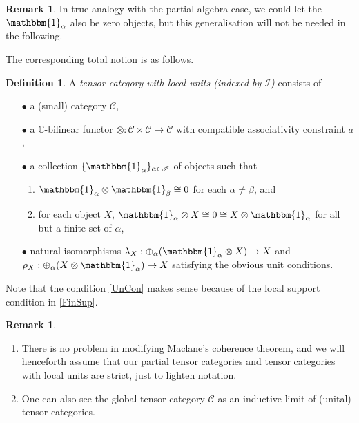 \documentclass[10pt]{article}
\newcommand{\C}{\mathbb{C}}
\newcommand{\CatC}{\mathcal{C}}
\newcommand{\Unitb}{\mathbbm{1}}
\theoremstyle{definition}
\newtheorem{Def}[Theorem]{Definition}
\newtheorem{Rem}[Theorem]{Remark}
\numberwithin{equation}{section}
\begin{document}
\begin{Rem} In true analogy with the partial algebra case, we could let the $\Unitb_\alpha$ also be zero objects, but this generalisation will not be needed in the following. 
\end{Rem}

The corresponding total notion is as follows. 

\begin{Def} A \emph{tensor category with local units (indexed by $\mathscr{I}$)} consists of
\begin{itemize}
\item[$\bullet$] a (small) category $\CatC$, 
\item[$\bullet$] a $\C$-bilinear functor $\otimes: \CatC\times \CatC \rightarrow \CatC$ with compatible associativity constraint $a$, 
\item[$\bullet$]\label{FinSup} a collection $\{\Unitb_\alpha\}_{\alpha\in \mathscr{I}}$ of objects such that 
\begin{enumerate}[label=(\arabic*)] 
\item $\Unitb_\alpha\otimes \Unitb_\beta \cong 0$ for each $\alpha\neq \beta$, and
\item for each object $X$,  $\Unitb_\alpha\otimes X \cong 0 \cong X\otimes \Unitb_\alpha$ for all but a finite set of $\alpha$,
\end{enumerate}
\item[$\bullet$]\label{UnCon} natural isomorphisms $\lambda_X:\oplus_\alpha (\Unitb_\alpha\otimes X) \rightarrow X$ and $\rho_X:\oplus_\alpha(X\otimes \Unitb_\alpha)\rightarrow X$ satisfying the obvious unit conditions. 
\end{itemize} 
\end{Def}

Note that the condition \ref{UnCon} makes sense because of the local support condition in \ref{FinSup}. 

\begin{Rem} \begin{enumerate}
\item There is no problem in modifying Maclane's coherence theorem, and we will henceforth assume that our partial tensor categories and tensor categories with local units are strict, just to lighten notation. 
\item One can also see the global tensor category $\CatC$ as an inductive limit of (unital) tensor categories. 
\end{enumerate}
\end{Rem}
\end{document}
